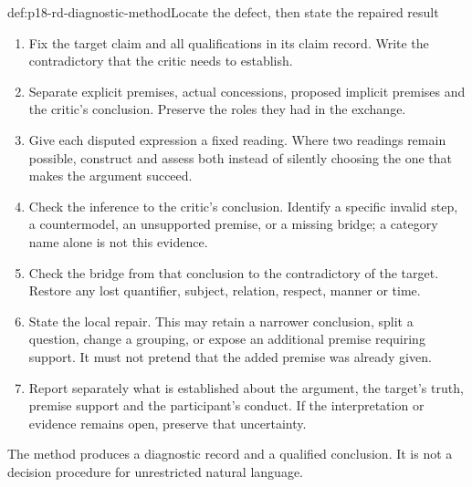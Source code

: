 \begin{hbmethod}{def:p18-rd-diagnostic-method}{Locate the defect, then state the repaired result}
\begin{enumerate}
\item Fix the target claim and all qualifications in its claim record.
Write the contradictory that the critic needs to establish.
\item Separate explicit premises, actual concessions, proposed implicit
premises and the critic's conclusion. Preserve the roles they had in
the exchange.
\item Give each disputed expression a fixed reading. Where two readings
remain possible, construct and assess both instead of silently choosing
the one that makes the argument succeed.
\item Check the inference to the critic's conclusion. Identify a specific
invalid step, a countermodel, an unsupported premise, or a missing
bridge; a category name alone is not this evidence.
\item Check the bridge from that conclusion to the contradictory of the
target. Restore any lost quantifier, subject, relation, respect, manner
or time.
\item State the local repair. This may retain a narrower conclusion,
split a question, change a grouping, or expose an additional premise
requiring support. It must not pretend that the added premise was
already given.
\item Report separately what is established about the argument, the
target's truth, premise support and the participant's conduct. If the
interpretation or evidence remains open, preserve that uncertainty.
\end{enumerate}
The method produces a diagnostic record and a qualified conclusion.
It is not a decision procedure for unrestricted natural language.
\end{hbmethod}

